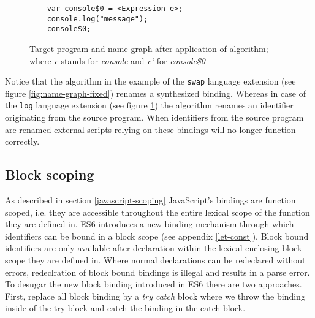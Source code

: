 \begin{figure}[h]
\centering
\begin{minipage}{0.65\linewidth}
\begin{lstlisting}
	var console$0 = <Expression e>;
	console.log("message");
	console$0;
\end{lstlisting}
\end{minipage}
\hfill
\begin{minipage}{0.25\linewidth}
\end{minipage}
\caption{Target program and name-graph after application of \textit{\vfix} algorithm; where \textit{c} stands for \textit{console} and \textit{c'} for \textit{console\$0}} \label{fig:vfix2_fixed}
\end{figure}

Notice that the \textit{\vfix} algorithm in the example of the \lstinline$swap$ language extension (see figure \ref{fig:name-graph-fixed}) renames a synthesized binding. Whereas in case of the \lstinline$log$ language extension (see figure \ref{fig:vfix2_fixed}) the \textit{\vfix} algorithm renames an identifier originating from the source program. When identifiers from the source program are renamed external scripts relying on these bindings will no longer function correctly.

\subsection{Block scoping}

As described in section \ref{javascript-scoping} JavaScript's bindings are function scoped, i.e. they are accessible throughout the entire lexical scope of the function they are defined in. ES6 introduces a new binding mechanism through which identifiers can be bound in a block scope (see appendix \ref{let-const}). Block bound identifiers are only available after declaration within the lexical enclosing block scope they are defined in. Where normal declarations can be redeclared without errors, redeclration of block bound bindings is illegal and results in a parse error. To desugar the new block binding introduced in ES6  there are two approaches. First, replace all block binding by a \textit{try catch} block where we throw the binding inside of the try block and catch the binding in the catch block.

